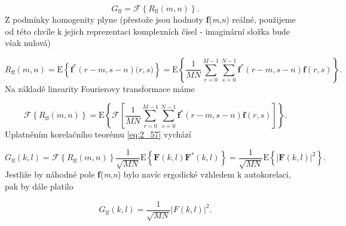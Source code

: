 \begin{equation}
    G_{\mathrm{ff}} = \mathscr{F} \left\{ R_{\mathrm{ff}}(m, n) \right\}.\nonumber
\end{equation}
Z podmínky homogenity plyne (přestože jsou hodnoty \textbf{f}(\textit{m},\textit{n}) reálné, použijeme od této chvíle k jejich reprezentaci komplexních čísel - imaginární složka bude však nulová)

\begin{equation}
    R_{\mathrm{ff}}(m, n) = \mathrm{E} \left\{ \mathbf{f}^{*}(r - m, s - n) \mathbf(r, s) \right\} = \mathrm{E} \left\{ \frac{1}{MN} \sum\limits_{r=0}^{M-1}\sum\limits_{s=0}^{N-1} \mathbf{f}^{*} (r - m, s - n) \mathbf{f}(r, s) \right\}.\nonumber
\end{equation}
Na základě linearity Fourierovy transformace máme

\begin{equation}
    \mathscr{F}\left\{ R_{\mathrm{ff}}(m, n) \right\} = \mathrm{E} \left\{ \mathscr{F} \left[ \frac{1}{MN} \sum\limits_{r=0}^{M-1}\sum\limits_{s=0}^{N-1} \mathbf{f}^{*} (r - m, s - n) \mathbf{f}(r, s) \right] \right\}.\nonumber
\end{equation}
Uplatněním korelačního teorému \eqref{eq:2_57} vychází

\begin{equation}
    G_{\mathrm{ff}}(k, l) = \mathscr{F} \left\{ R_{\mathrm{ff}}(m, n) \right\} \frac{1}{\sqrt{MN}} \mathrm{E} \left\{ \mathbf{F} (k, l) \mathbf{F}^{*}(k, l) \right\} = \frac{1}{\sqrt{MN}} \mathrm{E} \left\{ \left| \mathbf{F}(k, l) \right|^2 \right\}.\nonumber
\end{equation}
Jestliže by náhodné pole \textbf{f}(\textit{m},\textit{n}) bylo navíc ergodické vzhledem k autokorelaci, pak by dále platilo

\begin{equation}
    G_{\mathrm{ff}}(k, l) = \frac{1}{\sqrt{MN}} \left| F(k, l) \right|^2.\nonumber
\end{equation}

